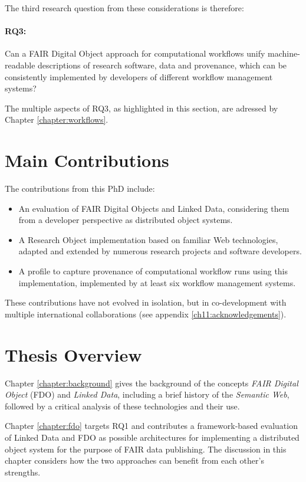 The third research question from these considerations is therefore: 

\paragraph{RQ3:} \label{rq3} Can a FAIR Digital Object approach for computational workflows unify machine-readable descriptions of research software, data and provenance, which can be consistently implemented by developers of different workflow management systems?

The multiple aspects of RQ3, as highlighted in this section, are adressed by Chapter \ref{chapter:workflows}.


\section{Main Contributions}
\label{intro:contributions}

The contributions from this PhD include:

\begin{itemize}
    \item An evaluation of FAIR Digital Objects and Linked Data, considering them from a developer perspective as distributed object systems.
    \item A Research Object implementation based on familiar Web technologies, adapted and extended by numerous research projects and software developers.
    \item A profile to capture provenance of computational workflow runs using this implementation, implemented by at least six workflow management systems.
\end{itemize}

These contributions have not evolved in isolation, but in co-development with multiple international collaborations (see appendix \vref{ch11:acknowledgements}).


\section{Thesis Overview}
\label{intro:overview}

Chapter \vref{chapter:background} gives the background of the concepts \emph{FAIR Digital Object} (FDO) and \emph{Linked Data}, including a brief history of the \emph{Semantic Web}, followed by a critical analysis of these technologies and their use. 

Chapter \vref{chapter:fdo} targets RQ1 and contributes a framework-based evaluation of Linked Data and FDO as possible architectures for implementing a distributed object system for the purpose of FAIR data publishing. The discussion in this chapter considers how the two approaches can benefit from each other's strengths. 

